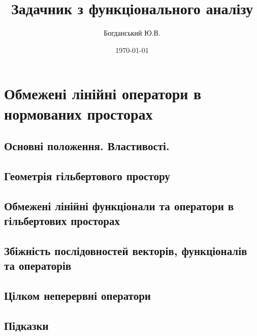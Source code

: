 \documentclass{extreport}
\author{Богданський Ю.В.}
\title{Задачник з функціонального аналізу}
\date{\today}
\begin{document}
    \maketitle
    \tableofcontents
    \chapter{Обмежені лінійні оператори в нормованих просторах}
        \section{Основні положення. Властивості.}
            
            
            
        \section{Геометрія гільбертового простору}
            
            
            
            
        \section{Обмежені лінійні функціонали та оператори в гільбертових просторах}
            
            
            
            
        \section{Збіжність послідовностей векторів, функціоналів та операторів}
            
            
            
        \section{Цілком неперервні оператори}
            
        \newpage
        \section*{Підказки}
            
\end{document}
